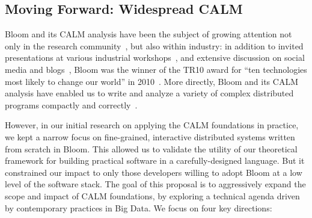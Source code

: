 \subsection{Moving Forward: Widespread CALM}
Bloom and its CALM analysis have been the subject of growing attention not only in the research community~\cite{Ameloot2011,Ameloot2012,Abiteboul2011,Green2011}, but also within industry: in addition to invited presentations at various industrial workshops~\cite{goto11,langnext12,basho12}, and extensive discussion on social media and blogs~\cite{}, Bloom was the winner of the TR10 award for ``ten technologies most likely to change our world'' in 2010~\cite{tr10}.  More directly, Bloom and its CALM analysis have enabled us to write and analyze a variety of complex distributed programs compactly and correctly~\cite{bud-sandbox}.  

However, in our initial research on applying the CALM foundations in practice, we kept a narrow focus on fine-grained, interactive distributed systems written from scratch in Bloom.  This allowed us to validate the utility of our theoretical framework for building practical software in a carefully-designed language.  But it constrained our impact to only those developers willing to adopt Bloom at a low level of the software stack.  The goal of this proposal is to aggressively expand the scope and impact of CALM foundations, by exploring a technical agenda driven by contemporary practices in Big Data.  We focus on four key directions:

